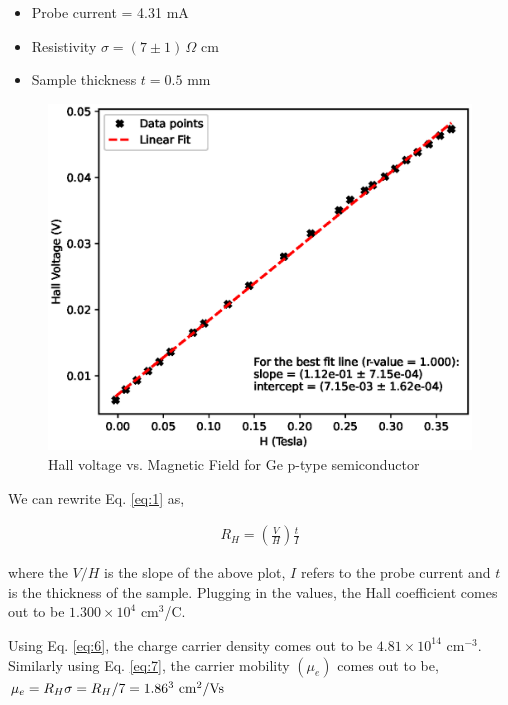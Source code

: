 \begin{itemize}
    \item Probe current = 4.31 mA
    \item Resistivity $\sigma = (7 \pm 1)\,\Omega$ cm 
    \item Sample thickness $t= 0.5$ mm\\
\end{itemize}


\begin{figure}[H]
    \centering
    \includegraphics[width=1\columnwidth]{images/ge-p.eps}
    \caption{Hall voltage vs. Magnetic Field for Ge p-type semiconductor}
    \label{fig:geP}
\end{figure}

We can rewrite Eq. \ref{eq:1} as,

\begin{align}
    R_H = \left(\frac{V}{H}\right)\frac{t}{I}
\end{align}

where the $V/H$ is the slope of the above plot, $I$ refers to the probe current and $t$ is the thickness of the sample. Plugging in the values, the Hall coefficient comes out to be $1.300 \times 10^4$ cm$^3$/C. 

Using Eq. \ref{eq:6}, the charge carrier density comes out to be $4.81 \times 10^{14}$ cm$^{-3}$. Similarly using Eq. \ref{eq:7}, the carrier mobility $(\mu_e)$ comes out to be,
$\mu_e = R_H\sigma=R_H / 7 = 1.86 \time 10^3\text{ cm}^2/\text{Vs}$


